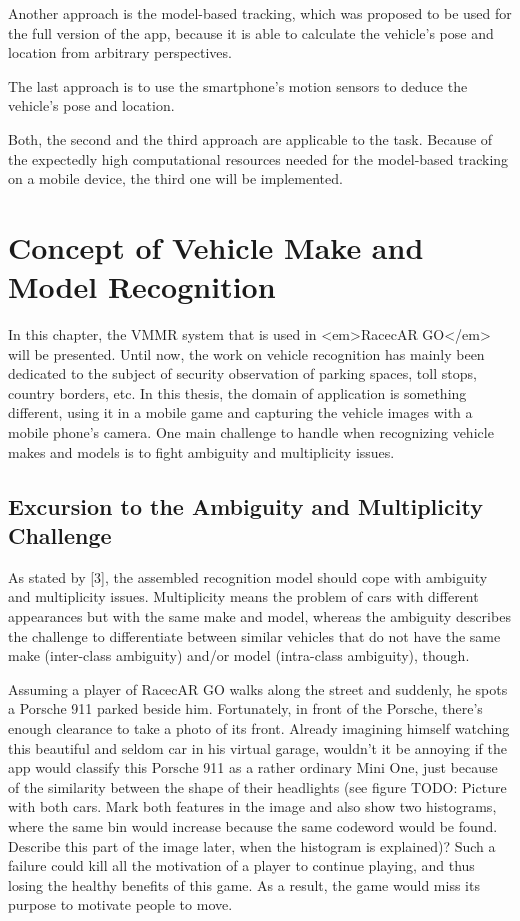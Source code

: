 Another approach is the model-based tracking, which was proposed to be used for the full version of the app, because it is able to calculate the vehicle’s pose and location from arbitrary perspectives.

The last approach is to use the smartphone’s motion sensors to deduce the vehicle’s pose and location.

Both, the second and the third approach are applicable to the task. Because of the expectedly high computational resources needed for the model-based tracking on a mobile device, the third one will be implemented.


\section{Concept of Vehicle Make and Model Recognition}\label{sec:vmmrConcept}
In this chapter, the VMMR system that is used in <em>RacecAR GO</em> will be presented. Until now, the work on vehicle recognition has mainly been dedicated to the subject of security observation of parking spaces, toll stops, country borders, etc. In this thesis, the domain of application is something different, using it in a mobile game and capturing the vehicle images with a mobile phone's camera. One main challenge to handle when recognizing vehicle makes and models is to fight ambiguity and multiplicity issues.

\subsection{Excursion to the Ambiguity and Multiplicity Challenge}
As stated by [3], the assembled recognition model should cope with ambiguity and multiplicity issues. Multiplicity means the problem of cars with different appearances but with the same make and model, whereas the ambiguity describes the challenge to differentiate between similar vehicles that do not have the same make (inter-class ambiguity) and/or model (intra-class ambiguity), though.

Assuming a player of RacecAR GO walks along the street and suddenly, he spots a Porsche 911 parked beside him. Fortunately, in front of the Porsche, there's enough clearance to take a photo of its front. Already imagining himself watching this beautiful and seldom car in his virtual garage, wouldn't it be annoying if the app would classify this Porsche 911 as a rather ordinary Mini One, just because of the similarity between the shape of their headlights (see figure TODO: Picture with both cars. Mark both features in the image and also show two histograms, where the same bin would increase because the same codeword would be found. Describe this part of the image later, when the histogram is explained)? Such a failure could kill all the motivation of a player to continue playing, and thus losing the healthy benefits of this game. As a result, the game would miss its purpose to motivate people to move.

